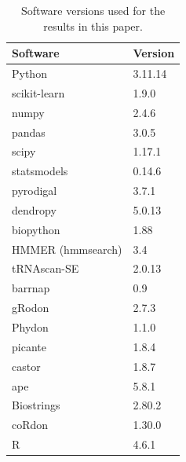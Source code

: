 \begin{table}[ht]\centering\small
\caption{Software versions used for the results in this paper.}\label{tab:software}
\begin{tabular}{ll}
\toprule
Software & Version \\
\midrule
Python & 3.11.14 \\
scikit-learn & 1.9.0 \\
numpy & 2.4.6 \\
pandas & 3.0.5 \\
scipy & 1.17.1 \\
statsmodels & 0.14.6 \\
pyrodigal & 3.7.1 \\
dendropy & 5.0.13 \\
biopython & 1.88 \\
HMMER (hmmsearch) & 3.4 \\
tRNAscan-SE & 2.0.13 \\
barrnap & 0.9 \\
gRodon & 2.7.3 \\
Phydon & 1.1.0 \\
picante & 1.8.4 \\
castor & 1.8.7 \\
ape & 5.8.1 \\
Biostrings & 2.80.2 \\
coRdon & 1.30.0 \\
R & 4.6.1 \\
\bottomrule
\end{tabular}
\end{table}
